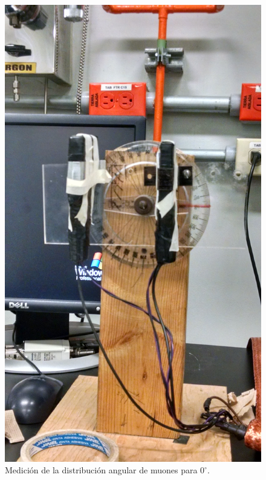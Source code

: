 \documentclass[a4paper,10pt]{article}
\numberwithin{equation}{section}
\begin{document}
\begin{figure}[H]
 \center 
 \includegraphics[scale=0.13]{Imagenes/angulo1}
 \caption{Medición de la distribución angular de muones para $0^\circ$.}
\end{figure}
\end{document}
